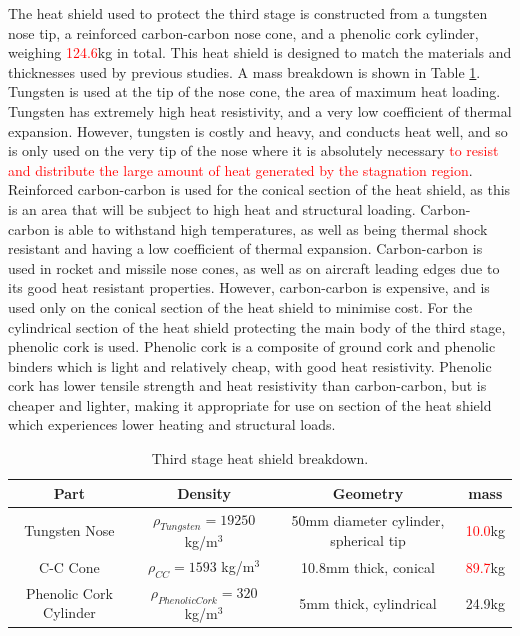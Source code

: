The heat shield used to protect the third stage is constructed from a tungsten nose tip, a reinforced carbon-carbon nose cone, and a phenolic cork cylinder, weighing \textcolor{red}{124.6}kg in total. This heat shield is designed to match the materials and thicknesses used by previous studies\cite{Preller2017b}. A mass breakdown is shown in Table \ref{tab:heatshield}.
Tungsten is used at the tip of the nose cone, the area of maximum heat loading. Tungsten has extremely high heat resistivity, and a very low coefficient of thermal expansion\cite{tungsten}. However, tungsten is costly and heavy, and conducts heat well, and so is only used on the very tip of the nose where it is absolutely necessary \textcolor{red}{to resist and distribute the large amount of heat generated by the stagnation region}. 
  Reinforced carbon-carbon is used for the conical section of the heat shield, as this is an area that will be subject to high heat and structural loading. Carbon-carbon is able to withstand high temperatures, as well as being thermal shock resistant and having a low coefficient of thermal expansion\cite{Fitzer}. Carbon-carbon is used in rocket and missile nose cones, as well as on aircraft leading edges due to its good heat resistant properties\cite{Fitzer}. However, carbon-carbon is expensive, and is used only on the conical section of the heat shield to minimise cost. For the cylindrical section of the heat shield protecting the main body of the third stage, phenolic cork is used. Phenolic cork is a composite of ground cork and phenolic binders which is light and relatively cheap, with good heat resistivity. Phenolic cork has lower tensile strength and heat resistivity than carbon-carbon\cite{Composites,Fitzer}, but is cheaper and lighter, making it appropriate for use on section of the heat shield which experiences lower heating and structural loads. 

		\begin{table}[h]
			\centering
\begin{tabular}{|c|c|c|c|}
	\hline  Part & Density & Geometry & mass \\ 
	\hline  Tungsten Nose & $\rho_{Tungsten} = 19250$  kg/m$^3$ & 50mm diameter cylinder, spherical tip & \textcolor{red}{10.0}kg \\ 
		\hline C-C Cone & $\rho_{CC} = 1593$  kg/m$^3$ & 10.8mm thick, conical & \textcolor{red}{89.7}kg \\ 
			\hline Phenolic Cork Cylinder & $\rho_{Phenolic Cork} = 320$  kg/m$^3$ & 5mm thick, cylindrical & 24.9kg \\ 
	\hline 
\end{tabular} 
\caption{Third stage heat shield breakdown.} %
\label{tab:heatshield}
\end{table}
		
